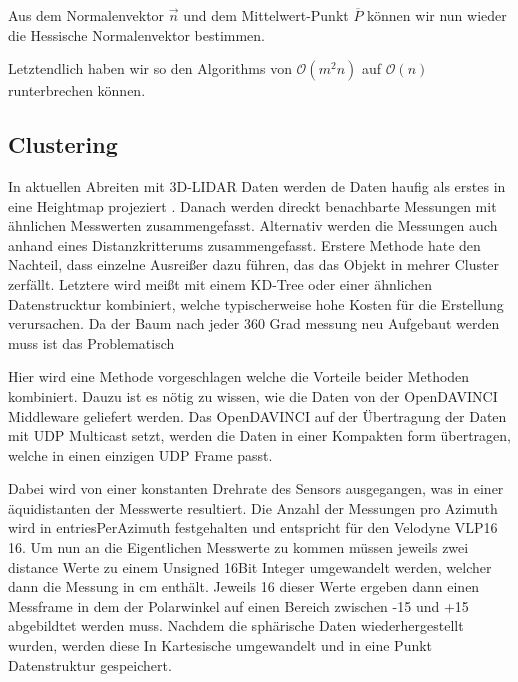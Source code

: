 \documentclass[11pt,oneside,openright]{mpreport}
\begin{document}
Aus dem Normalenvektor $\vec{n}$ und dem Mittelwert-Punkt $\overline{P}$ können wir nun wieder die Hessische Normalenvektor bestimmen.

Letztendlich haben wir so den Algorithms von $\mathcal{O}(m^2n) $ auf $\mathcal{O}(n) $ runterbrechen können.

\subsection{Clustering}
In aktuellen Abreiten mit 3D-LIDAR Daten werden de Daten haufig als erstes in eine Heightmap projeziert \cite{Zhang,Himmelsbach2009,Li2016}.
Danach werden direckt benachbarte Messungen mit ähnlichen Messwerten zusammengefasst. Alternativ werden die Messungen auch anhand eines Distanzkritterums 
zusammengefasst. Erstere Methode hate den Nachteil, dass einzelne Ausreißer dazu führen, das das Objekt in mehrer Cluster zerfällt.
Letztere wird meißt mit einem KD-Tree oder einer ähnlichen Datenstrucktur kombiniert, welche typischerweise hohe Kosten für die Erstellung verursachen.
Da der Baum nach jeder 360 Grad messung neu Aufgebaut werden muss ist das Problematisch

Hier wird eine Methode vorgeschlagen welche die Vorteile beider Methoden kombiniert. Dauzu ist es nötig zu wissen, wie die Daten von der OpenDAVINCI 
Middleware geliefert werden. Das OpenDAVINCI auf der Übertragung der Daten mit UDP Multicast setzt, werden die Daten in einer Kompakten form übertragen, welche in einen einzigen
UDP Frame passt.\\
\begin{center}
\end{center}
Dabei wird von einer konstanten Drehrate des Sensors ausgegangen, was in einer äquidistanten der Messwerte resultiert. Die Anzahl der Messungen pro Azimuth
wird in entriesPerAzimuth festgehalten und entspricht für den Velodyne VLP16 16. Um nun an die Eigentlichen Messwerte zu kommen müssen jeweils zwei distance Werte zu
einem Unsigned 16Bit Integer umgewandelt werden, welcher dann die Messung in cm enthält. Jeweils 16 dieser Werte ergeben dann einen Messframe in dem der Polarwinkel
auf einen Bereich zwischen -15 und +15 abgebildtet werden muss. Nachdem die sphärische Daten wiederhergestellt wurden, werden diese In Kartesische umgewandelt und
in eine Punkt Datenstruktur gespeichert. 
\end{document}
